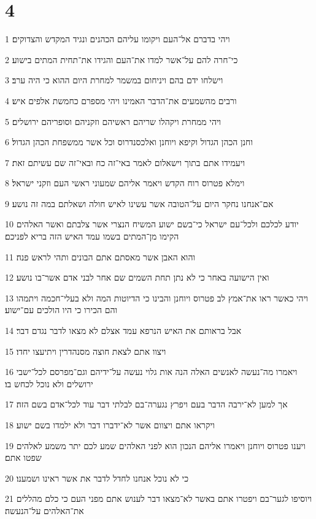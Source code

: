 \chapter{4}

\par 1 ויהי בדברם אל־העם ויקומו עליהם הכהנים ונגיד המקדש והצדוקים׃
\par 2 כי־חרה להם על־אשר למדו את־העם והגידו את־תחית המתים בישוע׃
\par 3 וישלחו ידם בהם ויניחום במשמר למחרת היום ההוא כי היה ערב׃
\par 4 ורבים מהשמעים את־הדבר האמינו ויהי מספרם כחמשת אלפים איש׃
\par 5 ויהי ממחרת ויקהלו שריהם ראשיהם וזקניהם וסופריהם ירושלים׃
\par 6 וחנן הכהן הגדול וקיפא ויוחנן ואלכסנדרוס וכל אשר ממשפחת הכהן הגדול׃
\par 7 ויעמידו אתם בתוך וישאלום לאמר באי־זה כח ובאי־זה שם עשיתם זאת׃
\par 8 וימלא פטרוס רוח הקדש ויאמר אליהם שמעוני ראשי העם וזקני ישראל׃
\par 9 אם־אנחנו נחקר היום על־הטובה אשר עשינו לאיש חולה ושאלתם במה זה נושע׃
\par 10 יודע לכלכם ולכל־עם ישראל כי־בשם ישוע המשיח הנצרי אשר צלבתם ואשר האלהים הקימו מן־המתים בשמו עמד האיש הזה בריא לפניכם׃
\par 11 והוא האבן אשר מאסתם אתם הבונים ותהי לראש פנה׃
\par 12 ואין הישועה באחר כי לא נתן תחת השמים שם אחר לבני אדם אשר־בו נושע׃
\par 13 ויהי כאשר ראו את־אמץ לב פטרוס ויוחנן והבינו כי הדיוטות המה ולא בעלי־חכמה ויתמהו והם הכירו כי היו הולכים עם־ישוע׃
\par 14 אבל בראותם את האיש הנרפא עמד אצלם לא מצאו לדבר נגדם דבר׃
\par 15 ויצוו אתם לצאת חוצה מסנהדרין ויתיעצו יחדו׃
\par 16 ויאמרו מה־נעשה לאנשים האלה הנה אות גלוי נעשה על־ידיהם וגם־מפרסם לכל־ישבי ירושלים ולא נוכל לכחש בו׃
\par 17 אך למען לא־ירבה הדבר בעם ויפרץ נגערה־בם לבלתי דבר עוד לכל־אדם בשם הזה׃
\par 18 ויקראו אתם ויצוום אשר לא־ידברו דבר ולא ילמדו בשם ישוע׃
\par 19 ויענו פטרוס ויוחנן ויאמרו אליהם הנכון הוא לפני האלהים שמע לכם יתר משמע לאלהים שפטו אתם׃
\par 20 כי לא נוכל אנחנו לחדל לדבר את אשר ראינו ושמענו׃
\par 21 ויוסיפו לגער־בם ויפטרו אתם באשר לא־מצאו דבר לענוש אתם מפני העם כי כלם מהללים את־האלהים על־הנעשה׃
